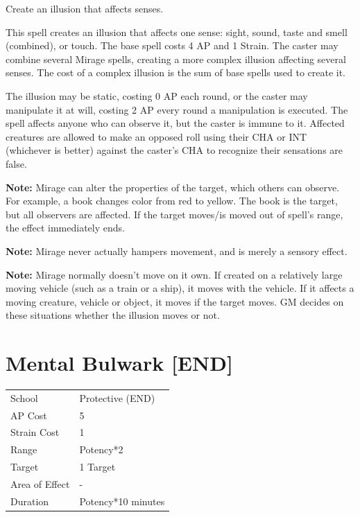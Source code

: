 \documentclass[11pt,a4paper,twocolumn]{book}
\begin{document}
\medskip

Create an illusion that affects senses.

This spell creates an illusion that affects one sense: sight, sound, taste and smell (combined), or touch. The base spell costs 4 AP and 1 Strain. The caster may combine several Mirage spells, creating a more complex illusion affecting several senses. The cost of a complex illusion is the sum of base spells used to create it.

The illusion may be static, costing 0 AP each round, or the caster may manipulate it at will, costing 2 AP every round a manipulation is executed. The spell affects anyone who can observe it, but the caster is immune to it. Affected creatures are allowed to make an opposed roll using their CHA or INT (whichever is better) against the caster's CHA to recognize their sensations are false.

\textbf{Note:} Mirage can alter the properties of the target, which others can observe. For example, a book changes color from red to yellow. The book is the target, but all observers are affected. If the target moves/is moved out of spell's range, the effect immediately ends.

\textbf{Note:} Mirage never actually hampers movement, and is merely a sensory effect.

\textbf{Note:} Mirage normally doesn't move on it own. If created on a relatively large moving vehicle (such as a train or a ship), it moves with the vehicle. If it affects a moving creature, vehicle or object, it moves if the target moves. GM decides on these situations whether the illusion moves or not.


\section*{Mental Bulwark [END]}
{
	\begin{tabu} to 75mm{| X[l,4] | X[l,7] |}
		\hline
		School 			& Protective (END) 		\\
        AP Cost	      	& 5 					\\
        Strain Cost     & 1 					\\
        Range     		& Potency*2				\\
        Target      	& 1 Target				\\
        Area of Effect  & -  	 				\\
        Duration     	& Potency*10 minutes	\\ \hline
	\end{tabu}
		
}
\end{document}
